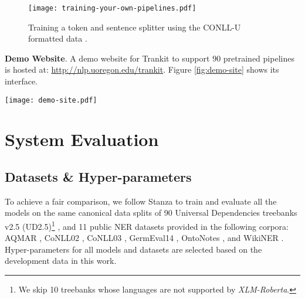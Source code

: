 \documentclass[11pt,a4paper]{article}
\begin{document}
\begin{figure}[ht]
    \centering
    \texttt{[image: training-your-own-pipelines.pdf]}
    \caption{Training a token and sentence splitter using the CONLL-U formatted data \cite{nivre-etal-2020-universal}.}
    \label{fig:train}
\end{figure}




\vspace{0.3cm}

\noindent \textbf{Demo Website}. A demo website for Trankit to support 90 pretrained pipelines is hosted at: \url{http://nlp.uoregon.edu/trankit}. Figure \ref{fig:demo-site} shows its interface.

\begin{figure*}[ht]
    \centering
    \texttt{[image: demo-site.pdf]}
    \caption{Demo website for Trankit.}
\label{fig:demo-site}
\end{figure*}

\section{System Evaluation}
\label{sec:exp}


\subsection{Datasets \& Hyper-parameters}

To achieve a fair comparison, we follow Stanza \cite{qi-etal-2020-stanza} to train and evaluate all the models on the same canonical data splits of 90 Universal Dependencies treebanks v2.5 (UD2.5)\footnote{We skip 10 treebanks whose languages are not supported by \textit{XLM-Roberta}.} \citep{11234/1-3105}, and 11 public NER datasets provided in the following corpora: AQMAR \citep{mohit-etal-2012-recall}, CoNLL02 \citep{tjong-kim-sang-2002-introduction}, CoNLL03 \citep{tjong-kim-sang-de-meulder-2003-introduction}, GermEval14 \citep{benikova-etal-2014-nosta}, OntoNotes \citep{weischedel2013ontonotes}, and WikiNER \citep{nothman2012:artint:wikiner}. Hyper-parameters for all models and datasets are selected based on the development data in this work.
\end{document}
